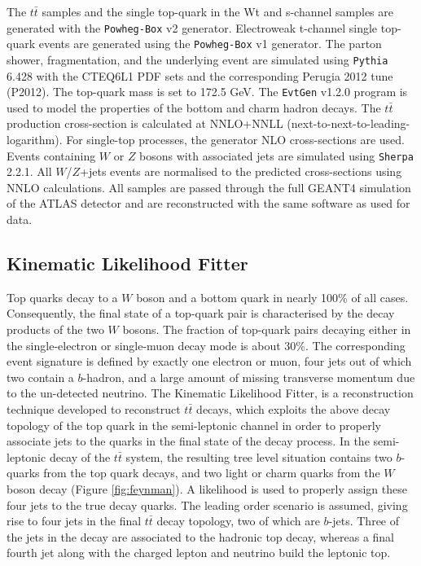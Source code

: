 \documentclass[letterpaper,12pt]{article}
\begin{document}
The $t\bar{t}$ samples and the single top-quark in the Wt and s-channel samples are generated with the {\tt Powheg-Box} v2 \cite{powheg} generator. Electroweak t-channel single top-quark events are generated using the {\tt Powheg-Box} v1 generator. The parton shower, fragmentation, and the underlying event are simulated using {\tt Pythia} 6.428\cite{pythia} with the CTEQ6L1 PDF sets and the corresponding Perugia 2012 tune (P2012)\cite{perugia}. The top-quark mass is set to 172.5 GeV. The {\tt EvtGen} v1.2.0 program \cite{evtgen} is used to model the properties of the bottom and charm hadron decays. The $t\bar{t}$ production cross-section is calculated at NNLO+NNLL (next-to-next-to-leading-logarithm)\cite{NNLO}. For single-top processes, the generator NLO cross-sections are used. Events containing $W$ or $Z$ bosons with associated jets are simulated using {\tt Sherpa} 2.2.1\cite{sherpa}. All $W$/$Z$+jets events are normalised to the predicted cross-sections using NNLO calculations. All samples are passed through the full GEANT4\cite{GEANT4} simulation of the ATLAS detector and are reconstructed with the same software as used for data.

\subsection{Kinematic Likelihood Fitter}
\label{KLFitter}
Top quarks decay to a $W$ boson and a bottom quark in nearly 100\% of all cases. Consequently, the final state of a top-quark pair is characterised by the decay products of the two $W$ bosons. %
The fraction of top-quark pairs decaying either in the single-electron or single-muon decay mode is about 30\%. The corresponding event signature is defined by exactly one electron or muon, four jets out of which two contain a $b$-hadron, and a large amount of missing transverse momentum due to the un-detected neutrino. The Kinematic Likelihood Fitter\cite{ERDMANN201418}, is a reconstruction technique developed to reconstruct $t\bar{t}$ decays, which exploits the above decay topology of the top quark in the semi-leptonic channel in order to properly associate jets to the quarks in the final state of the decay process. In the semi-leptonic decay of the $t\bar{t}$ system, the resulting tree level situation contains two $b$-quarks from the top quark decays, and two light or charm quarks from the $W$ boson decay (Figure \ref{fig:feynman}). A likelihood is used to properly assign these four jets to the true decay quarks. The leading order scenario is assumed, giving rise to four jets in the final $t\bar{t}$ decay topology, two of which are $b$-jets. Three of the jets in the decay are associated to the hadronic top decay, whereas a final fourth jet along with the charged lepton and neutrino build the leptonic top\cite{cjet}.
\end{document}
